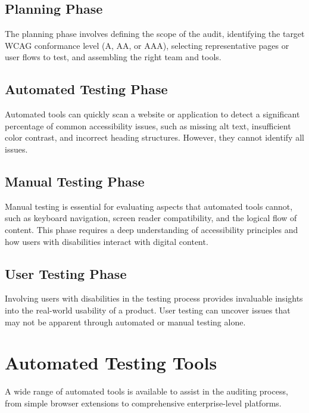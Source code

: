 \subsection{Planning Phase}
\label{subsec:planning-phase}
The planning phase involves defining the scope of the audit, identifying the target WCAG conformance level (A, AA, or AAA), selecting representative pages or user flows to test, and assembling the right team and tools.

\subsection{Automated Testing Phase}
\label{subsec:automated-testing-phase}
Automated tools can quickly scan a website or application to detect a significant percentage of common accessibility issues, such as missing alt text, insufficient color contrast, and incorrect heading structures. However, they cannot identify all issues.

\subsection{Manual Testing Phase}
\label{subsec:manual-testing-phase}
Manual testing is essential for evaluating aspects that automated tools cannot, such as keyboard navigation, screen reader compatibility, and the logical flow of content. This phase requires a deep understanding of accessibility principles and how users with disabilities interact with digital content.

\subsection{User Testing Phase}
\label{subsec:user-testing-phase}
Involving users with disabilities in the testing process provides invaluable insights into the real-world usability of a product. User testing can uncover issues that may not be apparent through automated or manual testing alone.
\supercite{Petrie2006}

\section{Automated Testing Tools}
\label{sec:automated-tools}
A wide range of automated tools is available to assist in the auditing process, from simple browser extensions to comprehensive enterprise-level platforms.

